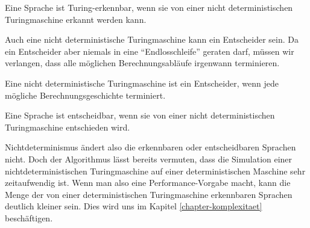 \begin{satz}
Eine Sprache ist Turing-erkennbar, wenn sie von einer nicht deterministischen
Turingmaschine erkannt werden kann.
\end{satz}

Auch eine nicht deterministische Turingmaschine kann ein Entscheider sein.
Da ein Entscheider aber niemals in eine ``Endlosschleife'' geraten darf,
müssen wir verlangen, dass alle möglichen Berechnungsabläufe
irgenwann terminieren.

\begin{definition}
%
%
Eine nicht deterministische Turingmaschine ist ein Entscheider, wenn
jede mögliche Berechnungsgeschichte terminiert.
\end{definition}

\begin{satz}
Eine Sprache ist entscheidbar, wenn sie von einer nicht deterministischen
Turingmaschine entschieden wird.
\end{satz}

Nichtdeterminismus ändert also die erkennbaren oder entscheidbaren Sprachen
nicht. Doch der Algorithmus lässt bereits vermuten, dass die Simulation
einer nichtdeterministischen Turingmaschine auf einer deterministischen
Maschine sehr zeitaufwendig ist. Wenn man also eine Performance-Vorgabe
macht, kann die Menge der von einer deterministischen Turingmaschine
erkennbaren Sprachen deutlich kleiner sein. Dies wird uns im Kapitel
\ref{chapter-komplexitaet} beschäftigen.

